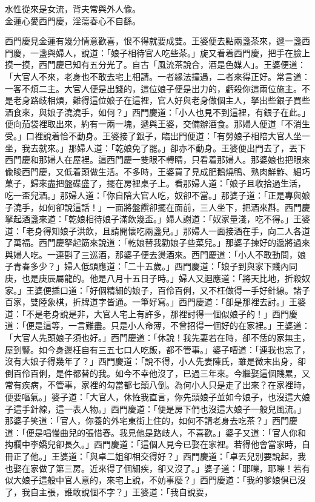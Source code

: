 \begin{myquote} 
水性從來是女流，背夫常與外人偸。\\金蓮心愛西門慶，淫蕩春心不自繇。
\end{myquote} 

西門慶見金蓮有幾分情意歡喜，恨不得就要成雙。王婆便去點兩盞茶來，遞一盞西門慶，一盞與婦人，說道：「娘子相待官人吃些茶。」旋又看着西門慶，把手在臉上摸一摸，西門慶已知有五分光了。自古「風流茶說合，酒是色媒人」。王婆便道：「大官人不來，老身也不敢去宅上相請。一者緣法撞遇，二者來得正好。常言道：一客不煩二主。大官人便是出錢的，這位娘子便是出力的，虧殺你這兩位施主。不是老身路歧相煩，難得這位娘子在這裡，官人好與老身做個主人，拏出些銀子買些酒食來，與娘子澆澆手，如何？」西門慶道：「小人也見不到這裡，有銀子在此。」便向茄袋裡取出來，約有一兩一塊，遞與王婆，交備辦酒食。那婦人便道「不消生受。」口裡說着恰不動身。王婆接了銀子，臨出門便道：「有勞娘子相陪大官人坐一坐，我去就來。」那婦人道：「乾娘免了罷。」卻亦不動身。{}王婆便出門去了，丟下西門慶和那婦人在屋裡。這西門慶一雙眼不轉睛，只看着那婦人。那婆娘也把眼來偸睃西門慶，又低着頭做生活。不多時，王婆買了見成肥鵝燒鴨、熟肉鮮鮓、細巧菓子，歸來盡把盤碟盛了，擺在房裡桌子上。看那婦人道：「娘子且收拾過生活，吃一盃兒酒。」那婦人道：「你自陪大官人吃，奴卻不當。」那婆子道：「正是專與娘子澆手，如何卻說這話！」一面將盤饌卻擺在面前，三人坐下，把酒來斟。西門慶拏起酒盞來道：「乾娘相待娘子滿飲幾盃。」婦人謝道：「奴家量淺，吃不得。」王婆道：「老身得知娘子洪飲，且請開懷吃兩盞兒。」那婦人一面接酒在手，向二人各道了萬福。西門慶拏起筯來說道：「乾娘替我勸娘子些菜兒。」那婆子揀好的遞將過來與婦人吃。一連斟了三巡酒，那婆子便去燙酒來。西門慶道：「小人不敢動問，娘子青春多少？」婦人低頭應道：「二十五歲。」西門慶道：「娘子到與家下賤內同庚，也是庚辰屬龍的。他是八月十五日子時。」婦人又迴應道：「將天比地，折殺奴家。」王婆便插口道：「好個精細的娘子，百伶百俐，又不枉做得一手好針線。諸子百家，雙陸象棋，折牌道字皆通。一筆好寫。」西門慶道：「卻是那裡去討。」王婆道：「不是老身說是非，大官人宅上有許多，那裡討得一個似娘子的！」西門慶道：「便是這等，一言難盡。只是小人命薄，不曾招得一個好的在家裡。」王婆道：「大官人先頭娘子須也好。」西門慶道：「休說！我先妻若在時，卻不恁的家無主，屋到豎。如今身邊枉自有三五七口人吃飯，都不管事。」婆子嘈道：「連我也忘了，沒有大娘子得幾年了？」西門慶道：「說不得，小人先妻陳氏，雖是微末出身，卻倒百伶百俐，{}是件都替的我。如今不幸他沒了，已過三年來。今繼娶這個賤累，又常有疾病，不管事，家裡的勾當都七顛八倒。為何小人只是走了出來？在家裡時，便要嘔氣。」婆子道：「大官人，休恠我直言，你先頭娘子並如今娘子，也沒這大娘子這手針線，這一表人物。」西門慶道：「便是房下們也沒這大娘子一般兒風流。」{}{}那婆子笑道：「官人，你養的外宅東街上住的，如何不請老身去吃茶？」西門慶道：「便是唱慢曲兒的張惜春。我見他是路歧人，不喜歡。」婆子又道：「官人你和抅欄中李嬌兒卻長久。」西門慶道：「這個人見今已娶在家裡。若得他會當家時，自冊正了他。」王婆道：「與卓二姐卻相交得好？」西門慶道：「卓丟兒別要說起，我也娶在家做了第三房。近來得了個細疾，卻又沒了。」婆子道：「耶嚛，耶嚛！若有似大娘子這般中官人意的，來宅上說，不妨事麼？」西門慶道：「我的爹娘俱已沒了，我自主張，誰敢說個不字？」王婆道：「我自說耍，